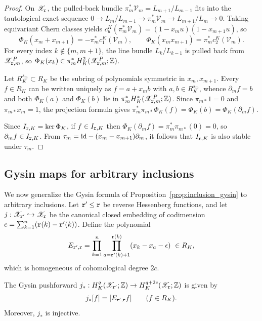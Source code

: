 \begin{proof}
On $\mathscr X_{\mathtt r}$, the pulled-back bundle $\pi_m^*\mathcal V_m=L_{m+1}/L_{m-1}$ fits into
the tautological exact sequence $0\to L_m/L_{m-1}\to\pi_m^*\mathcal V_m\to L_{m+1}/L_m\to 0$.
Taking equivariant Chern classes yields $c_u^K(\pi_m^*\mathcal V_m)=(1-x_m u)(1-x_{m+1}u)$, so
\[
  \Phi_K(x_m+x_{m+1})=-\pi_m^*c_1^K(\mathcal V_m),\qquad
  \Phi_K(x_m x_{m+1})=\pi_m^*c_2^K(\mathcal V_m).
\]
For every index $k\notin\{m,m+1\}$, the line bundle $L_k/L_{k-1}$ is pulled back from $\mathscr X_{\mathtt r,m}^P$,
so $\Phi_K(x_k)\in\pi_m^*H_K^2(\mathscr X_{\mathtt r,m}^P;\mathbb Z)$.

Let $R_K^{s_m}\subset R_K$ be the subring of polynomials symmetric in $x_m,x_{m+1}$.
Every $f\in R_K$ can be written uniquely as $f=a+x_m b$ with $a,b\in R_K^{s_m}$,
whence $\partial_m f=b$ and both $\Phi_K(a)$ and $\Phi_K(b)$ lie in $\pi_m^*H_K^*(\mathscr X_{\mathtt r,m}^P;\mathbb Z)$.
Since $\pi_{m*}1=0$ and $\pi_{m*}x_m=1$, the projection formula gives
$\pi_m^*\pi_{m*}\Phi_K(f)=\Phi_K(b)=\Phi_K(\partial_m f)$.

Since $I_{\mathtt r,K}=\ker\Phi_K$, if $f\in I_{\mathtt r,K}$ then
$\Phi_K(\partial_m f)=\pi_m^*\pi_{m*}(0)=0$, so $\partial_m f\in I_{\mathtt r,K}$.
From $\tau_m=\mathrm{id}-(x_m-x_{m+1})\partial_m$, it follows that $I_{\mathtt r,K}$ is also stable under $\tau_m$.
\end{proof}

\subsection{Gysin maps for arbitrary inclusions}

We now generalize the Gysin formula of Proposition~\ref{prop:inclusion_gysin} to arbitrary inclusions.
Let $\mathtt r'\leq\mathtt r$ be reverse Hessenberg functions, and let
$j:\mathscr X_{\mathtt r'}\hookrightarrow\mathscr X_{\mathtt r}$ be the canonical closed embedding of codimension
$c=\sum_{k=1}^n(\mathtt r(k)-\mathtt r'(k))$.
Define the polynomial
\[
  E_{\mathtt r',\mathtt r}
  =\prod_{k=1}^n\prod_{a=\mathtt r'(k)+1}^{\mathtt r(k)}
       (x_k-x_a-\epsilon)\ \in R_K,
\]
which is homogeneous of cohomological degree $2c$.

\begin{proposition}\label{prop:general_gysin}
The Gysin pushforward $j_*:H_K^q(\mathscr X_{\mathtt r'};\mathbb Z)\to H_K^{q+2c}(\mathscr X_{\mathtt r};\mathbb Z)$ is given by
\[
  j_*[f]=[E_{\mathtt r',\mathtt r}f] \qquad (f\in R_K).
\]
Moreover, $j_*$ is injective.
\end{proposition}

